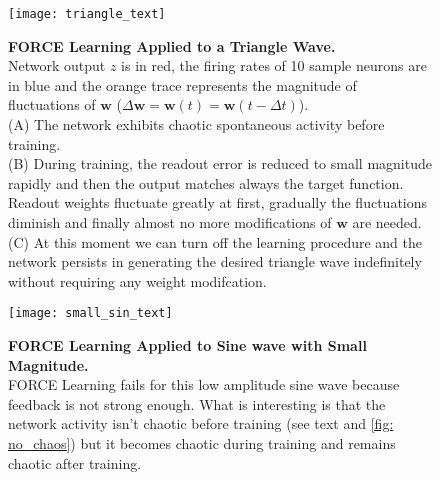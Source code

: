 \vspace*{-1em}
\begin{figure}[H]
  \centering
  \texttt{[image: triangle\_text]}
  \caption{
    \textbf{FORCE Learning Applied to a Triangle Wave.}\\[0.1 em]
    Network output $z$ is in red, the firing rates of 10 sample neurons
    are in blue and the orange trace represents the magnitude of
    fluctuations of $\mathbf{w}$ 
    ($\Delta \mathbf{w} = \mathbf{w}(t) = \mathbf{w}(t - \Delta t)$).\\[0.1em]
    (A) The network exhibits chaotic spontaneous activity before training.
    \\[0.1em]
    (B) During training, the readout error is reduced to small magnitude 
    rapidly and then the output matches always the target function.
    Readout weights fluctuate greatly at first, gradually the fluctuations
    diminish and finally almost no more modifications of $\mathbf{w}$ are 
    needed.\\[0.1 em]
    (C) At this moment we can turn off the learning procedure and the network 
    persists in generating the desired triangle wave indefinitely
    without requiring any weight modifcation.
  }
  \label{fig: triangle}
\end{figure}

\vfill

\begin{figure}[H]
  \centering
  \texttt{[image: small\_sin\_text]}
  \caption{
    \textbf{FORCE Learning Applied to Sine wave with Small Magnitude.}
    \\[0.1em]
    FORCE Learning fails for this low amplitude sine wave because
    feedback is not strong enough. What is interesting is that the network
    activity isn't chaotic before training 
    (see text and \autoref{fig: no_chaos})
    but it becomes chaotic during training and remains chaotic after training.
  }
  \label{fig: small_sin}
\end{figure}
\vfill

\newpage


